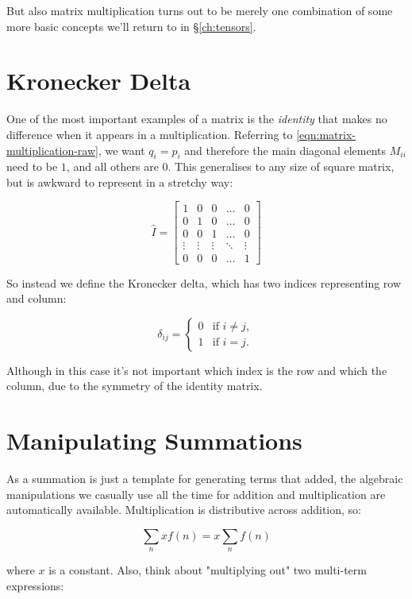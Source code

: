 But also matrix multiplication turns out to be merely one combination of some more basic concepts we'll return to in §\ref{ch:tensors}.

\section{Kronecker Delta} \label{def:Kronecker}

One of the most important examples of a matrix is the \textit{identity} that makes no difference when it appears in a multiplication. Referring to \eqref{eqn:matrix-multiplication-raw}, we want $q_i = p_i$ and therefore the main diagonal elements $M_{ii}$ need to be $1$, and all others are $0$. This generalises to any size of square matrix, but is awkward to represent in a stretchy way:

$$
\hat{I} = \begin{bmatrix}
1 & 0 & 0 & \dots & 0 \\
0 & 1 & 0 & \dots & 0 \\
0 & 0 & 1 & \dots & 0 \\
\vdots & \vdots & \vdots & \ddots & \vdots\\
0 & 0 & 0 & \dots & 1
\end{bmatrix}
$$

So instead we define the Kronecker delta, which has two indices representing row and column:

$$
\delta_{ij} = \begin{cases}
0 &\text{if } i \neq j,   \\
1 &\text{if } i=j.   \end{cases}
$$

Although in this case it's not important which index is the row and which the column, due to the symmetry of the identity matrix.

\section{Manipulating Summations}

As a summation is just a template for generating terms that added, the algebraic manipulations we casually use all the time for addition and multiplication are automatically available. Multiplication is distributive across addition, so:

$$
\sum_{n} x f(n) = x \sum_{n} f(n)
$$

where $x$ is a constant. Also, think about "multiplying out" two multi-term expressions:

